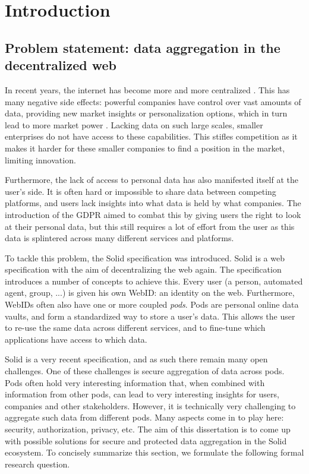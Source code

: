 \chapter{Introduction}
\label{cha:intro}

\section{Problem statement: data aggregation in the decentralized web}
\label{sec:problem}
In recent years, the internet has become more and more centralized \citep{internet-report}. This has many negative side effects: powerful companies have control over vast amounts of data, providing new market insights or personalization options, which in turn lead to more market power \citep{big-tech-innovation, platform-monopolies}. Lacking data on such large scales, smaller enterprises do not have access to these capabilities. This stifles competition as it makes it harder for these smaller companies to find a position in the market, limiting innovation. 

Furthermore, the lack of access to personal data has also manifested itself at the user's side. It is often hard or impossible to share data between competing platforms, and users lack insights into what data is held by what companies. The introduction of the \gls{GDPR} \citep{GDPR} aimed to combat this by giving users the right to look at their personal data, but this still requires a lot of effort from the user as this data is splintered across many different services and platforms. 

To tackle this problem, the Solid \citep{solid} specification was introduced. Solid is a web specification with the aim of decentralizing the web again. The specification introduces a number of concepts to achieve this. Every user (a person, automated agent, group, ...) is given his own WebID: an identity on the web. Furthermore, WebIDs often also have one or more coupled \textit{pods}. Pods are personal online data vaults, and form a standardized way to store a user's data. This allows the user to re-use the same data across different services, and to fine-tune which applications have access to which data.

Solid is a very recent specification, and as such there remain many open challenges. One of these challenges is secure aggregation of data across pods. Pods often hold very interesting information that, when combined with information from other pods, can lead to very interesting insights for users, companies and other stakeholders. However, it is technically very challenging to aggregate such data from different pods. Many aspects come in to play here: security, authorization, privacy, etc. The aim of this dissertation is to come up with possible solutions for secure and protected data aggregation in the Solid ecosystem. 
To concisely summarize this section, we formulate the following formal research question.\\

